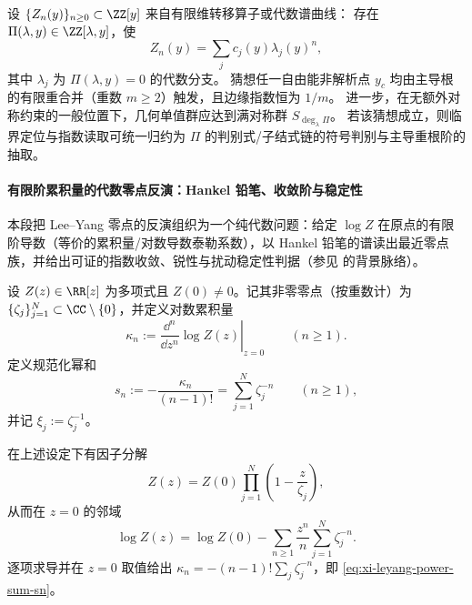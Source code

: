 \begin{conjecture}\label{conj:xi-terminal-algebraic-spectrum-integer-puiseux-principle}
设 \(\{Z_n(y)\}_{n\ge0}\subset\ZZ[y]\) 来自有限维转移算子或代数谱曲线：
存在 \(\Pi(\lambda,y)\in\ZZ[\lambda,y]\)，使
\[
Z_n(y)=\sum_j c_j(y)\lambda_j(y)^n,
\]
其中 \(\lambda_j\) 为 \(\Pi(\lambda,y)=0\) 的代数分支。
猜想任一自由能非解析点 \(y_c\) 均由主导根的有限重合并（重数 \(m\ge2\)）触发，且边缘指数恒为 \(1/m\)。
进一步，在无额外对称约束的一般位置下，几何单值群应达到满对称群 \(S_{\deg_\lambda\Pi}\)。
若该猜想成立，则临界定位与指数读取可统一归约为 \(\Pi\) 的判别式/子结式链的符号判别与主导重根阶的抽取。
\end{conjecture}





\paragraph{有限阶累积量的代数零点反演：Hankel 铅笔、收敛阶与稳定性}
本段把 Lee--Yang 零点的反演组织为一个纯代数问题：给定 \(\log Z\) 在原点的有限阶导数（等价的累积量/对数导数泰勒系数），以 Hankel 铅笔的谱读出最近零点族，并给出可证的指数收敛、锐性与扰动稳定性判据（参见 \cite{LeeYang1952LatticeGasIsing,FlindtGarrahan2013Trajectory} 的背景脉络）。

\begin{definition}[对数累积量与规范化幂和]\label{def:xi-leyang-cumulant-power-sums}
设 \(Z(z)\in\RR[z]\) 为多项式且 \(Z(0)\neq 0\)。记其非零零点（按重数计）为 \(\{\zeta_j\}_{j=1}^N\subset\CC\setminus\{0\}\)，并定义对数累积量
\[
\kappa_n:=\left.\frac{\dd^n}{\dd z^n}\log Z(z)\right|_{z=0}\qquad(n\ge 1).
\]
定义规范化幂和
\begin{equation}\label{eq:xi-leyang-power-sum-sn}
s_n:=-\frac{\kappa_n}{(n-1)!}=\sum_{j=1}^N \zeta_j^{-n}\qquad(n\ge 1),
\end{equation}
并记 \(\xi_j:=\zeta_j^{-1}\)。
\end{definition}

\begin{remark}[零点--累积量幂和恒等式]\label{rem:xi-leyang-zero-cumulant-identity}
在上述设定下有因子分解
\[
Z(z)=Z(0)\prod_{j=1}^N\left(1-\frac{z}{\zeta_j}\right),
\]
从而在 \(z=0\) 的邻域
\[
\log Z(z)=\log Z(0)-\sum_{n\ge 1}\frac{z^n}{n}\sum_{j=1}^N\zeta_j^{-n}.
\]
逐项求导并在 \(z=0\) 取值给出
\(
\kappa_n=-(n-1)!\sum_j\zeta_j^{-n}
\)，即 \eqref{eq:xi-leyang-power-sum-sn}。
\end{remark}

